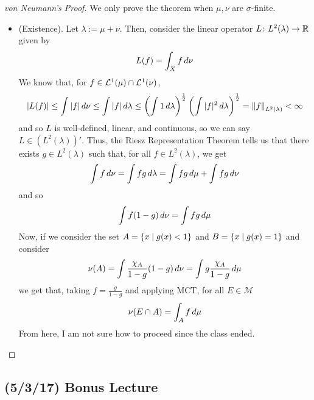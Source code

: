 \documentclass[11pt,leqno,oneside]{amsbook}
\numberwithin{thm}{section}
\newcommand{\M}{\mathcal{M}} %
\newcommand{\cL}{\mathcal{L}}
\newcommand{\s}{$\sigma$-} %
\begin{document}
\begin{proof}[von Neumann's Proof]
  We only prove the theorem when \(\mu,\nu\) are \s finite.
  \begin{itemize}
  \item (Existence). Let \(\lambda := \mu + \nu\). Then, consider the
    linear operator \(L \from L^2(\lambda) \to \R\) given by \[
      L(f) =  \int_X f \d \nu
    \]
    We know that, for \(f \in \cL^1(\mu) \intersect \cL^1(\nu)\), \[
      |L(f)| \leq \int |f| \d\nu \leq \int |f| \d\lambda \leq \left(
        \int 1 \d\lambda \right)^\frac{1}{2} \left( \int |f|^2
        \d\lambda \right)^\frac{1}{2} = \norm[f]_{L^2(\lambda)} <
      \infty
    \]
    and so \(L\) is well-defined, linear, and continuous, so we can
    say \(L \in (L^2(\lambda))'\). Thus, the Riesz Representation
    Theorem tells us that there exists \(g \in L^2(\lambda)\) such
    that, for all \(f \in L^2(\lambda)\), we get \[
      \int f \d\nu = \int fg \d\lambda = \int fg \d\mu + \int fg \d \nu
    \]
    and so \[
      \int f(1-g) \d\nu = \int fg \d\mu
    \]
    Now, if we consider the set \(A = \{x \st g(x) < 1\}\) and \(B =
    \{x \st g(x) = 1\}\) and consider \[
      \nu(A) = \int \frac{\chi_{A}}{1-g}(1-g) \d\nu = \int g
      \frac{\chi_A}{1-g} \d \mu
    \]
    we get that, taking \(f = \frac{g}{1-g}\) and applying MCT, for
    all \(E \in \M\) \[
      \nu(E \intersect A) = \int_A f \d\mu
    \]
    From here, I am not sure how to proceed since the class ended.
  \end{itemize}
\end{proof}
\subsection*{(5/3/17) Bonus Lecture}
\end{document}
